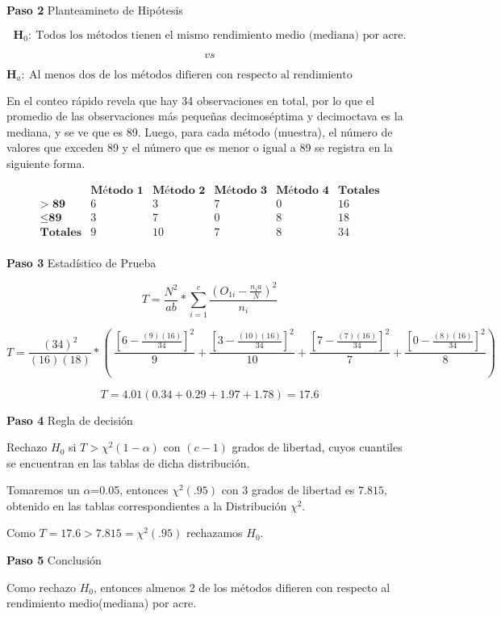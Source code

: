 \documentclass[
  a4paper,
  oneside,
  openany]{book}
\begin{document}
\textbf{Paso 2} Planteamineto de Hipótesis

\[\textbf{H}_0: \ \mbox{Todos los métodos tienen el mismo rendimiento medio (mediana) por acre.}\]

\[vs\]

\[\textbf{H}_a: \ \mbox{Al menos dos de los métodos difieren con respecto al rendimiento medio(mediana) por acre.}\]

En el conteo rápido revela que hay 34 observaciones en total, por lo que el promedio de las observaciones más pequeñas decimoséptima y decimoctava es la mediana, y se ve que es 89. Luego, para cada método (muestra), el número de valores que exceden 89 y el número que es menor o igual a 89 se registra en la siguiente forma.

\[
\begin{array}{c|c|c|c|c|c}
 & \textbf{Método 1} & \textbf{Método 2} & \textbf{Método 3} & \textbf{Método 4}& \textbf{Totales} \\
\hline
\textbf{> 89} & 6 & 3 & 7 & 0 & 16  \\
\hline
\leq \textbf{89} & 3 & 7 & 0 & 8 & 18\\
\hline
\textbf{Totales}  & 9  & 10  & 7 & 8  & 34 \\
\end{array}
\]

\textbf{Paso 3} Estadístico de Prueba

\[T=\frac{N^2}{ab}*\sum^{c}_{i=1}\frac{(O_{1i}-\frac{n_{i}a}{N})^2}{n_i}\]

\[T=\frac{(34)^2}{(16)(18)}*\left(\ \frac{\left[6-\frac{(9)(16)}{34}\right]^2}{9}+\frac{\left[3-\frac{(10)(16)}{34}\right]^2}{10}+\frac{\left[7-\frac{(7)(16)}{34}\right]^2}{7}+\frac{\left[0-\frac{(8)(16)}{34}\right]^2}{8} \right)\]

\[T=4.01(0.34+0.29+1.97+1.78) = 17.6\]

\textbf{Paso 4} Regla de decisión

Rechazo \(H_0\) si \(T> \chi^2(1-\alpha)\) con \((c-1)\) grados de libertad, cuyos cuantiles se encuentran en las tablas de dicha distribución.

Tomaremos un \(\alpha\)=0.05, entonces \(\chi^2(.95)\) con 3 grados de libertad es \(7.815\), obtenido en las tablas correspondientes a la Distribución \(\chi^2\).

Como \(T=17.6 > 7.815=\chi^2(.95)\) rechazamos \(H_0\).

\textbf{Paso 5} Conclusión

Como rechazo \(H_0\), entonces almenos 2 de los métodos difieren con respecto al rendimiento medio(mediana) por acre.
\end{document}
